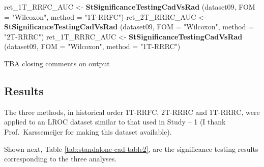 \documentclass[
]{article}
\newenvironment{Shaded}{\begin{snugshade}}{\end{snugshade}}
\newcommand{\DataTypeTok}[1]{\textcolor[rgb]{0.13,0.29,0.53}{#1}}
\newcommand{\KeywordTok}[1]{\textcolor[rgb]{0.13,0.29,0.53}{\textbf{#1}}}
\newcommand{\NormalTok}[1]{#1}
\newcommand{\StringTok}[1]{\textcolor[rgb]{0.31,0.60,0.02}{#1}}
\begin{document}
\begin{Shaded}
\begin{Highlighting}[]
\NormalTok{ret\_1T\_RRFC\_AUC \textless{}{-}}\StringTok{ }\KeywordTok{StSignificanceTestingCadVsRad}\NormalTok{ (dataset09, }
\DataTypeTok{FOM =} \StringTok{"Wilcoxon"}\NormalTok{, }\DataTypeTok{method =} \StringTok{"1T{-}RRFC"}\NormalTok{)}
\NormalTok{ret\_2T\_RRRC\_AUC \textless{}{-}}\StringTok{ }\KeywordTok{StSignificanceTestingCadVsRad}\NormalTok{ (dataset09, }
\DataTypeTok{FOM =} \StringTok{"Wilcoxon"}\NormalTok{, }\DataTypeTok{method =} \StringTok{"2T{-}RRRC"}\NormalTok{)}
\NormalTok{ret\_1T\_RRRC\_AUC \textless{}{-}}\StringTok{ }\KeywordTok{StSignificanceTestingCadVsRad}\NormalTok{ (dataset09, }
\DataTypeTok{FOM =} \StringTok{"Wilcoxon"}\NormalTok{, }\DataTypeTok{method =} \StringTok{"1T{-}RRRC"}\NormalTok{)}
\end{Highlighting}
\end{Shaded}

TBA closing comments on output

\hypertarget{standalone-cad-radiologists-results}{%
\subsection{Results}\label{standalone-cad-radiologists-results}}

The three methods, in historical order \(\text{1T-RRFC}\), \(\text{2T-RRRC}\) and \(\text{1T-RRRC}\), were applied to an LROC dataset similar to that used in Study -- 1 (I thank Prof.~Karssemeijer for making this dataset available).

Shown next, Table \ref{tab:standalone-cad-table2}, are the significance testing results corresponding to the three analyses.
\end{document}
